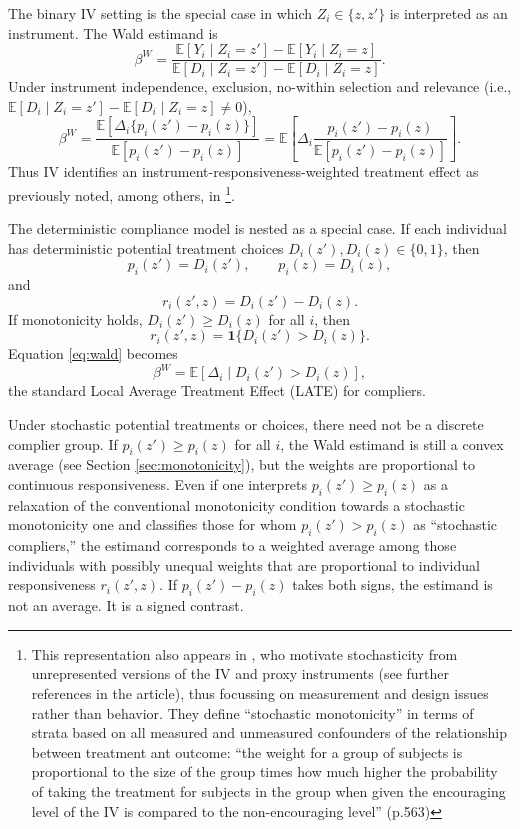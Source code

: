 \documentclass[11pt]{article}
\newcommand{\E}{\mathbb{E}}
\newcommand{\1}{\mathbf{1}}
\begin{document}
    The binary IV setting is the special case in which $Z_i\in\{z,z'\}$ is interpreted as an instrument. The Wald estimand is
\begin{equation} \label{eq:wald}
        \beta^W
        =\frac{\E[Y_i\mid Z_i=z']-\E[Y_i\mid Z_i=z]}{\E[D_i\mid Z_i=z']-\E[D_i\mid Z_i=z]}.
\end{equation}
Under instrument independence, exclusion, no-within selection and relevance (i.e., $\E[D_i\mid Z_i=z']-\E[D_i\mid Z_i=z] \ne 0$),
\[
\beta^W
=
\frac{\E[\Delta_i\{p_i(z')-p_i(z)\}]}
     {\E[p_i(z')-p_i(z)]}
=
\E\!\left[
\Delta_i
\frac{p_i(z')-p_i(z)}
     {\E[p_i(z')-p_i(z)]}
\right].
\]
Thus IV identifies an instrument-responsiveness-weighted treatment effect as previously noted, among others, in \cite{dinardolee2011}\footnote{This representation also appears in \cite{small2017}, who motivate stochasticity from unrepresented versions of the IV and proxy instruments (see further references in the article), thus focussing on measurement and design issues rather than behavior.  They define ``stochastic monotonicity'' in terms of strata based on all measured and unmeasured confounders of the relationship between treatment ant outcome: ``the weight for a group of subjects is proportional to the size of the group times how much higher the probability of taking the treatment for subjects in the group when given the encouraging level of the IV is compared to the non-encouraging level'' (p.563)}.

The deterministic compliance model is nested as a special case. If each individual has deterministic potential treatment choices $D_i(z'),D_i(z)\in\{0,1\}$, then
\[
        p_i(z')=D_i(z'),
        \qquad
        p_i(z)=D_i(z),
\]
and
\[
        r_i(z',z)=D_i(z')-D_i(z).
\]
If monotonicity holds, $D_i(z')\geq D_i(z)$ for all $i$, then
\[
        r_i(z',z)=\1\{D_i(z')>D_i(z)\}.
\]
Equation \eqref{eq:wald} becomes
\[
        \beta^W=\E[\Delta_i\mid D_i(z')>D_i(z)],
\]
the standard Local Average Treatment Effect (LATE) for compliers.

Under stochastic potential treatments or choices, there need not be a discrete complier group. If $p_i(z')\geq p_i(z)$ for all $i$, the Wald estimand is still a convex average (see Section \ref{sec:monotonicity}), but the weights are proportional to continuous responsiveness. Even if one interprets $p_i(z')\geq p_i(z)$ as a relaxation of the conventional monotonicity condition towards a stochastic monotonicity one and classifies those for whom $p_i(z')> p_i(z)$ as ``stochastic compliers,'' the estimand corresponds to a weighted average among those individuals with possibly unequal weights that are proportional to individual responsiveness $r_i(z',z)$.  
If $p_i(z')-p_i(z)$ takes both signs, the estimand is not an average. It is a signed contrast.
\end{document}
